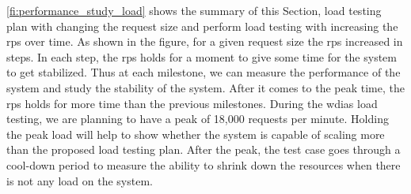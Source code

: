 \cref{fi:performance_study_load} shows the summary of this Section, load testing plan with changing the request size and perform load testing with increasing the \acrshort{rps} over time. As shown in the figure, for a given request size the \acrshort{rps} increased in steps. In each step, the \acrshort{rps} holds for a moment to give some time for the system to get stabilized. Thus at each milestone, we can measure the performance of the system and study the stability of the system. After it comes to the peak time, the \acrshort{rps} holds for more time than the previous milestones. During the \acrshort{wdias} load testing, we are planning to have a peak of 18,000 requests per minute. Holding the peak load will help to show whether the system is capable of scaling more than the proposed load testing plan. After the peak, the test case goes through a cool-down period to measure the ability to shrink down the resources when there is not any load on the system.

